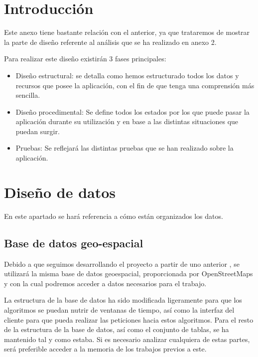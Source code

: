 
\section{Introducción}

Este anexo tiene bastante relación con el anterior, ya que trataremos de mostrar la parte de diseño referente al análisis que se ha realizado en anexo 2. 

Para realizar este diseño existirán 3 fases principales:

\begin{itemize}
\item Diseño estructural: se detalla como hemos estructurado todos los datos y recursos que posee la aplicación, con el fin de que tenga una comprensión más sencilla.
\item Diseño procedimental: Se define todos los estados por los que puede pasar la aplicación durante su utilización y en base a las distintas situaciones que puedan surgir.
\item Pruebas: Se reflejará las distintas pruebas que se han realizado sobre la aplicación.
\end{itemize}

\section{Diseño de datos}

En este apartado se hará referencia a cómo están organizados los datos.

\subsection{Base de datos geo-espacial}

Debido a que seguimos desarrollando el proyecto a partir de uno anterior \cite{tfm1}, se utilizará la misma base de datos geoespacial, proporcionada por OpenStreetMaps y con la cual podremos acceder a datos necesarios para el trabajo.

La estructura de la base de datos ha sido modificada ligeramente para que los algoritmos se puedan nutrir de ventanas de tiempo, así como la interfaz del cliente para que pueda realizar las peticiones hacia estos algoritmos. Para el resto de la estructura de la base de datos, así como el conjunto de tablas, se ha mantenido tal y como estaba. Si es necesario analizar cualquiera de estas partes, será preferible acceder a la memoria de los trabajos previos \cite{tfg1} \cite{tfm1} a este.

